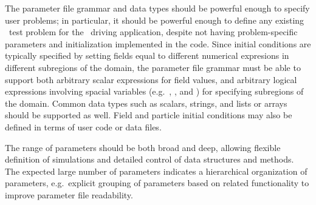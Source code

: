 \documentclass{article}
\begin{document}
The parameter file grammar and data types should be powerful enough to
specify user problems; in particular, it should be powerful enough to
define any existing \enzo\ test problem for the \enzoii\ driving
application, despite not having problem-specific parameters and
initialization implemented in the code.  Since initial conditions are
typically specified by setting fields equal to different numerical
expresions in different subregions of the domain, the parameter file
grammar must be able to support both arbitrary scalar expressions for
field values, and arbitrary logical expressions involving spacial
variables (e.g.~, , and ) for specifying
subregions of the domain.  Common data types such as scalars, strings,
and lists or arrays should be supported as well.  Field and particle
initial conditions may also be defined in terms of user code or data
files.

The range of parameters should be both broad and deep, allowing
flexible definition of simulations and detailed control of data
structures and methods.  The expected large number of parameters
indicates a hierarchical organization of parameters, e.g.~explicit
grouping of parameters based on related functionality to improve
parameter file readability.

 
\end{document}
